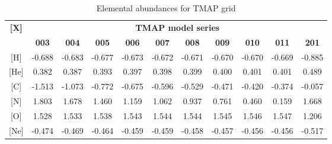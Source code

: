 				\begin{table}[h!]
					\centering
					\caption{Elemental abundances for TMAP grid}
					\label{rauch:abundances}
					\begin{tabular}{|c|cccccccccc|}
						\hline
						\multirow{2}{*}{\textbf{{[}X{]}}} & \multicolumn{10}{c|}{\textbf{TMAP model series}} \\ \cline{2-11} & \multicolumn{1}{c|}{\textbf{003}} & \multicolumn{1}{c|}{\textbf{004}} & \multicolumn{1}{c|}{\textbf{005}} & \multicolumn{1}{c|}{\textbf{006}} & \multicolumn{1}{c|}{\textbf{007}} & \multicolumn{1}{c|}{\textbf{008}} & \multicolumn{1}{c|}{\textbf{009}} & \multicolumn{1}{c|}{\textbf{010}} & \multicolumn{1}{c|}{\textbf{011}} & \textbf{201} \\ \hline
						{[}H{]} & \multicolumn{1}{c|}{-0.688} & \multicolumn{1}{c|}{-0.683} & \multicolumn{1}{c|}{-0.677} & \multicolumn{1}{c|}{-0.673} & \multicolumn{1}{c|}{-0.672} & \multicolumn{1}{c|}{-0.671} & \multicolumn{1}{c|}{-0.670} & \multicolumn{1}{c|}{-0.670} & \multicolumn{1}{c|}{-0.669} & -0.885 \\ \hline
						{[}He{]} & \multicolumn{1}{c|}{0.382} & \multicolumn{1}{c|}{0.387} & \multicolumn{1}{c|}{0.393} & \multicolumn{1}{c|}{0.397} & \multicolumn{1}{c|}{0.398} & \multicolumn{1}{c|}{0.399} & \multicolumn{1}{c|}{0.400} & \multicolumn{1}{c|}{0.401} & \multicolumn{1}{c|}{0.401} & 0.489 \\ \hline
						{[}C{]} & \multicolumn{1}{c|}{-1.513} & \multicolumn{1}{c|}{-1.073} & \multicolumn{1}{c|}{-0.772} & \multicolumn{1}{c|}{-0.675} & \multicolumn{1}{c|}{-0.596} & \multicolumn{1}{c|}{-0.529} & \multicolumn{1}{c|}{-0.471} & \multicolumn{1}{c|}{-0.420} & \multicolumn{1}{c|}{-0.374} & -0.057 \\ \hline
						{[}N{]} & \multicolumn{1}{c|}{1.803} & \multicolumn{1}{c|}{1.678} & \multicolumn{1}{c|}{1.460} & \multicolumn{1}{c|}{1.159} & \multicolumn{1}{c|}{1.062} & \multicolumn{1}{c|}{0.937} & \multicolumn{1}{c|}{0.761} & \multicolumn{1}{c|}{0.460} & \multicolumn{1}{c|}{0.159} & 1.668 \\ \hline
						{[}O{]} & \multicolumn{1}{c|}{1.528} & \multicolumn{1}{c|}{1.533} & \multicolumn{1}{c|}{1.538} & \multicolumn{1}{c|}{1.543} & \multicolumn{1}{c|}{1.544} & \multicolumn{1}{c|}{1.544} & \multicolumn{1}{c|}{1.545} & \multicolumn{1}{c|}{1.546} & \multicolumn{1}{c|}{1.547} & 1.206 \\ \hline
						{[}Ne{]} & \multicolumn{1}{c|}{-0.474} & \multicolumn{1}{c|}{-0.469} & \multicolumn{1}{c|}{-0.464} & \multicolumn{1}{c|}{-0.459} & \multicolumn{1}{c|}{-0.459} & \multicolumn{1}{c|}{-0.458} & \multicolumn{1}{c|}{-0.457} & \multicolumn{1}{c|}{-0.456} & \multicolumn{1}{c|}{-0.456} & -0.517 \\ \hline

\end{tabular}
\end{table}

